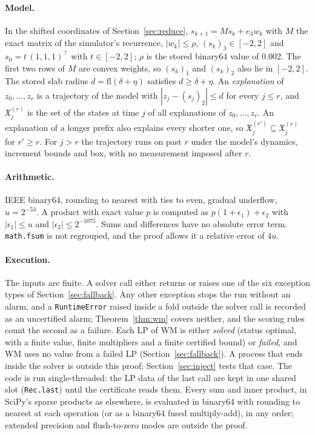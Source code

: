 \documentclass[11pt,a4paper]{article}
\begin{document}
\paragraph{Model.} In the shifted coordinates of Section~\ref{sec:reduce}, $s_{k+1} = M s_k + e_3 w_k$ with $M$ the exact matrix of
the simulator's recurrence, $|w_k|\le\rho$, $(s_k)_3\in[-2,2]$ and $s_0 = t\,(1,1,1)^\top$ with $t\in[-2,2]$; $\rho$ is
the stored binary64 value of 0.002. The first two rows of $M$ are convex weights, so $(s_k)_1$ and $(s_k)_2$ also lie in
$[-2,2]$. The stored slab radius $d = \mathrm{fl}(\delta+\eta)$ satisfies $d\ge\delta+\eta$. An \emph{explanation} of
$z_0,\dots,z_r$ is a trajectory of the model with $|z_j-(s_j)_2|\le d$ for every $j\le r$, and $\mathfrak{X}^{(r)}_j$ is
the set of the states at time $j$ of all explanations of $z_0,\dots,z_r$. An explanation of a longer prefix also
explains every shorter one, so $\mathfrak{X}^{(r')}_j\subseteq\mathfrak{X}^{(r)}_j$ for $r'\ge r$. For $j>r$ the
trajectory runs on past $r$ under the model's dynamics, increment bounds and box, with no measurement imposed after
$r$.

\paragraph{Arithmetic.} IEEE binary64, rounding to nearest with ties to even, gradual underflow, $u = 2^{-53}$. A
product with exact value $p$ is computed as $p(1+\epsilon_1)+\epsilon_2$ with $|\epsilon_1|\le u$ and
$|\epsilon_2|\le2^{-1075}$. Sums and differences have no absolute error term. \texttt{math.fsum} is not regrouped, and
the proof allows it a relative error of $4u$.

\paragraph{Execution.} The inputs are finite. A solver call either returns or raises one of the
six exception types of Section~\ref{sec:fallback}. Any other exception stops the run without an alarm, and a
\texttt{RuntimeError} raised inside a fold outside the solver call is recorded as an uncertified alarm; Theorem~\ref{thm:wm} covers neither,
and the scoring rules count the second as a failure. Each LP of WM is
either \emph{solved} (status optimal, with a finite value, finite multipliers and a finite certified bound) or
\emph{failed}, and WM uses no value from a failed LP (Section~\ref{sec:fallback}). A process that ends inside the solver
is outside this proof; Section~\ref{sec:inject} tests that case. The code is run single-threaded: the LP data of the
last call are kept in one shared slot (\texttt{Rec.last}) until the certificate reads them. Every sum and inner
product, in SciPy's sparse products as elsewhere, is evaluated in binary64 with rounding to nearest at each operation
(or as a binary64 fused multiply-add), in any order; extended precision and flush-to-zero modes are outside the proof.
\end{document}
